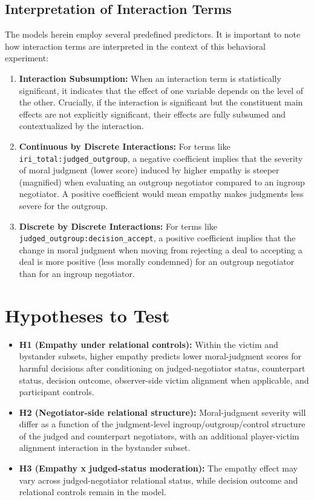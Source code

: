 \documentclass[11pt]{article}
\begin{document}
\subsection{Interpretation of Interaction Terms}
The models herein employ several predefined predictors. It is important to note how interaction terms are interpreted in the context of this behavioral experiment:
\begin{enumerate}
  \item \textbf{Interaction Subsumption:} When an interaction term is statistically significant, it indicates that the effect of one variable depends on the level of the other. Crucially, if the interaction is significant but the constituent main effects are not explicitly significant, their effects are fully subsumed and contextualized by the interaction.
  \item \textbf{Continuous by Discrete Interactions:} For terms like \texttt{iri\_total:judged\_outgroup}, a negative coefficient implies that the severity of moral judgment (lower score) induced by higher empathy is steeper (magnified) when evaluating an outgroup negotiator compared to an ingroup negotiator. A positive coefficient would mean empathy makes judgments less severe for the outgroup.
  \item \textbf{Discrete by Discrete Interactions:} For terms like \texttt{judged\_outgroup:decision\_accept}, a positive coefficient implies that the change in moral judgment when moving from rejecting a deal to accepting a deal is more positive (less morally condemned) for an outgroup negotiator than for an ingroup negotiator.
\end{enumerate}

\section{Hypotheses to Test}
\begin{itemize}
  \item \textbf{H1 (Empathy under relational controls):} Within the victim and bystander subsets, higher empathy predicts lower moral-judgment scores for harmful decisions after conditioning on judged-negotiator status, counterpart status, decision outcome, observer-side victim alignment when applicable, and participant controls.
  \item \textbf{H2 (Negotiator-side relational structure):} Moral-judgment severity will differ as a function of the judgment-level ingroup/outgroup/control structure of the judged and counterpart negotiators, with an additional player-victim alignment interaction in the bystander subset.
  \item \textbf{H3 (Empathy x judged-status moderation):} The empathy effect may vary across judged-negotiator relational status, while decision outcome and relational controls remain in the model.
\end{itemize}
\end{document}
